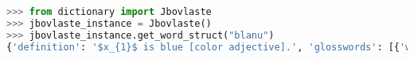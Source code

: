 \begin{lstlisting}[language=Python, caption=Jbovlaste class being used by a Python script]
>>> from dictionary import Jbovlaste
>>> jbovlaste_instance = Jbovlaste()
>>> jbovlaste_instance.get_word_struct("blanu")
{'definition': '$x_{1}$ is blue [color adjective].', 'glosswords': [{'word': 'blue', 'sense': None}], 'type': 'gismu'}
\end{lstlisting}